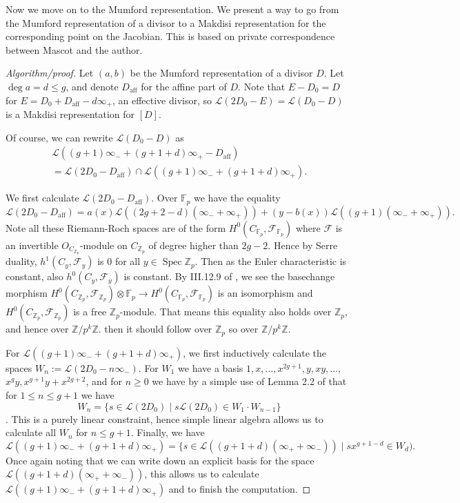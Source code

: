 \documentclass[12pt]{article}
\newcommand{\Z}{\mathbb{Z}}
\newcommand{\Fcal}{\mathcal{F}}
\newcommand{\Lcal}{\mathcal{L}}
\newcommand{\F}{\mathbb{F}}
\newcommand{\tensor}{\otimes}
\DeclareMathOperator{\Spec}{Spec}
\theoremstyle{plain}
\theoremstyle{definition}
\theoremstyle{remark}
\begin{document}
Now we move on to the Mumford representation. We present a way to go from the Mumford representation of a divisor to a Makdisi representation for the corresponding point on the Jacobian. This is based on private correspondence between Mascot and the author.
\begin{proof}[Algorithm/proof]
Let $(a,b)$ be the Mumford representation of a divisor $D$. Let $\deg a = d \leq g$, and denote $D_{\text{aff}}$ for the affine part of $D$. Note that $E-D_0 = D$ for $E = D_0 + D_{\text{aff}} - d\infty_+$, an effective divisor, so $\Lcal(2D_0 - E) = \Lcal(D_0 - D)$ is a Makdisi representation for $[D]$.

Of course, we can rewrite $\Lcal(D_0 -D)$ as 
\begin{multline*}
\Lcal((g+1)\infty_- + (g+1+d)\infty_+ - D_{\text{aff}}) \\= \Lcal(2D_0 - D_{\text{aff}} ) \cap \Lcal((g+1)\infty_- + (g+1+d)\infty_+).
\end{multline*}

We first calculate $\Lcal(2D_0 - D_{\text{aff}})$. Over $\F_p$ we have the equality
\[
\Lcal(2D_0 - D_{\text{aff}}) = a(x)\Lcal((2g+2-d)(\infty_- + \infty_+)) + (y-b(x))\Lcal((g+1)(\infty_- + \infty_+)).
\]
Note all these Riemann-Roch spaces are of the form $H^0(C_{\F_p},\Fcal_{\F_p})$ where $\Fcal$ is an invertible $O_{C_{\Z_p}}$-module on $C_{\Z_p}$ of degree higher than $2g-2$. Hence by Serre duality, $h^{1}(C_y,\Fcal_y)$ is $0$ for all $y \in \Spec \Z_p$. Then as the Euler characteristic is constant, also $h^{0}(C_y,\Fcal_y)$ is constant. By III.12.9 of \cite{hartshorne}, we see the basechange morphism $H^0(C_{\Z_p},\Fcal_{\Z_p}) \tensor \F_p \to H^0(C_{\F_p},\Fcal_{\F_p})$ is an isomorphism and $H^0(C_{\Z_p},\Fcal_{\Z_p})$ is a free $\Z_p$-module. That means this equality also holds over $\Z_p$, and hence over $\Z/p^k\Z$. then it should follow over $\Z_p$ so over $\Z/p^k\Z$.  

For $\Lcal((g+1)\infty_- + (g+1+d)\infty_+)$, we first inductively calculate the spaces $W_n := \Lcal(2D_0 - n\infty_-)$. For $W_1$ we have a basis $1,x,\dots,x^{2g+1},y,xy,\dots$, $x^g y, x^{g+1}y+x^{2g+2}$, and for $n \geq 0$ we have by a simple use of Lemma 2.2 of \cite{makdisi04} that for $1 \leq n \leq g+1$ we have \[W_{n} = \{s \in \Lcal(2D_0) \mid s\Lcal(2D_0) \in W_1 \cdot W_{n-1}\}\]. This is a purely linear constraint, hence simple linear algebra allows us to calculate all $W_n$ for $n \leq g+1$. Finally, we have
\[
\Lcal((g+1)\infty_- + (g+1+d)\infty_+) = \{ s \in \Lcal((g+1+d)(\infty_+ + \infty_-)) \mid sx^{g+1-d} \in W_d).
\] 
Once again noting that we can write down an explicit basis for the space $\Lcal((g+1+d)(\infty_+ + \infty_-))$, this allows us to calculate $\Lcal((g+1)\infty_- + (g+1+d)\infty_+)$ and to finish the computation.
\end{proof}
\end{document}
